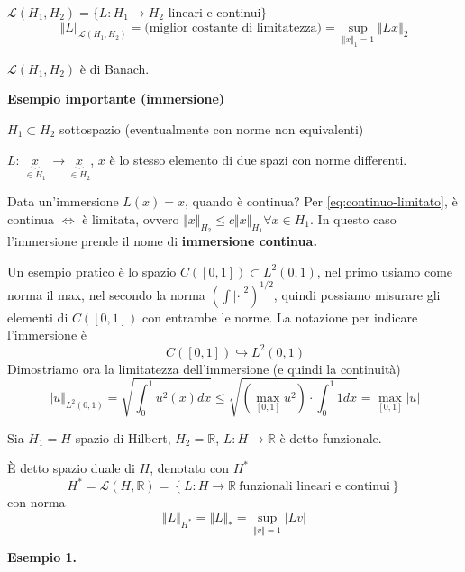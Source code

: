 \documentclass[10pt,a4paper,twoside,openright]{book}
\begin{document}
\begin{definition}
$\displaystyle \mathcal{L}(H_{1},H_{2}) =\{L:H_{1}\rightarrow H_{2}$ lineari e continui$\displaystyle \}$
\begin{equation*}
\Vert L\Vert _{\mathcal{L}(H_{1},H_{2})} =\text{(miglior costante di limitatezza)} =\sup _{\Vert x\Vert _{1} =1}\Vert Lx\Vert _{2}
\end{equation*}
\end{definition}
\begin{theorem}
$\displaystyle \mathcal{L}(H_{1},H_{2})$ è di Banach.
\end{theorem}
\textbf{Esempio importante (immersione)}

$\displaystyle H_{1} \subset H_{2}$ sottospazio (eventualmente con norme non equivalenti)

$\displaystyle L:\ \underbrace{x}_{\in H_{1}} \ \rightarrow \underbrace{x}_{\in H_{2}}$, $\displaystyle x$ è lo stesso elemento di due spazi con norme differenti. 

Data un'immersione $\displaystyle L(x) =x$, quando è continua? Per \eqref{eq:continuo-limitato}, è continua $\displaystyle \Leftrightarrow $ è limitata, ovvero $\displaystyle \Vert x\Vert _{H_{2}} \leqslant c\Vert x\Vert _{H_{1}} \forall x\in H_{1}$. In questo caso l'immersione prende il nome di \textbf{immersione continua.}

Un esempio pratico è lo spazio $\displaystyle C([ 0,1]) \subset L^{2}(0,1)$, nel primo usiamo come norma il max, nel secondo la norma $\displaystyle \left(\int | \cdot | ^{2}\right)^{1/2}$, quindi possiamo misurare gli elementi di $\displaystyle C([ 0,1])$ con entrambe le norme. La notazione per indicare l'immersione è
\begin{equation*}
\ C([ 0,1]) \hookrightarrow L^{2}(0,1)
\end{equation*}
Dimostriamo ora la limitatezza dell'immersione (e quindi la continuità)
\begin{equation*}
\Vert u\Vert _{L^{2}(0,1)} =\sqrt{\int ^{1}_{0} u^{2}(x) dx} \leqslant \sqrt{\left(\max_{[ 0,1]} u^{2}\right) \cdot \int ^{1}_{0} 1dx} =\max_{[ 0,1]}| u| 
\end{equation*}
\begin{definition}
[Funzionale] Sia $\displaystyle H_{1} =H$ spazio di Hilbert, $\displaystyle H_{2} =\mathbb{R}$, $\displaystyle L:H\rightarrow \mathbb{R}$ è detto funzionale.
\end{definition}
\begin{definition}
 È detto spazio duale di $\displaystyle H$, denotato con $\displaystyle H^{*}$
\begin{equation*}
H^{*} =\mathcal{L}(H,\mathbb{R}) =\left\{L:H\rightarrow \mathbb{R} \ \text{funzionali lineari e continui}\right\}
\end{equation*}
con norma
\begin{equation*}
\Vert L\Vert _{H^{*}} =\Vert L\Vert _{*} =\sup _{\Vert v\Vert =1}| Lv| 
\end{equation*}
\end{definition}
\textbf{Esempio 1.}
\end{document}
